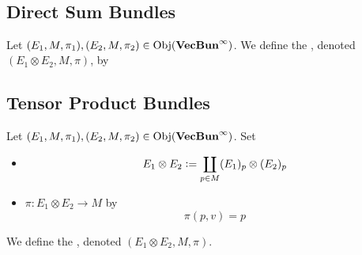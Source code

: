 \documentclass{book}
\begin{document}
\begin{ex}  \\
\end{ex}







































\subsection{Direct Sum Bundles}


\begin{defn}
	Let $(E_1, M, \pi_1), (E_2, M, \pi_2) \in \operatorname{Obj}(\operatorname*{\text{\textbf{VecBun}}^{\infty}})$. We define the , denoted $(E_1 \otimes E_2, M, \pi)$, by
\end{defn}

















\subsection{Tensor Product Bundles}


\begin{defn}
Let $(E_1, M, \pi_1), (E_2, M, \pi_2) \in \operatorname{Obj}(\operatorname*{\text{\textbf{VecBun}}^{\infty}})$. Set
\begin{itemize}
	\item $$E_1 \otimes E_2 \vcentcolon= \coprod_{p \in M} (E_1)_p \otimes (E_2)_p$$
	\item $\pi: E_1 \otimes E_2 \rightarrow M$ by 
	$$\pi(p, v) = p$$
\end{itemize}

 We define the , denoted $(E_1 \otimes E_2, M, \pi)$.
\end{defn}
\end{document}
